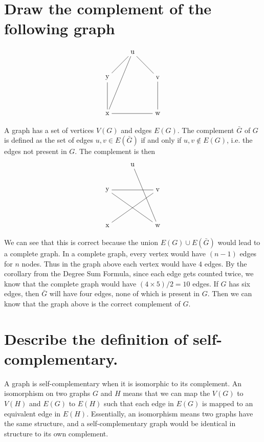 \documentclass{article}
\begin{document}
\section{Draw the complement of the following graph}
\begin{equation}
\centering
\begin{tikzpicture}[node distance=5em]
	\node (u) at (0,0) {u};
	\node (y) [below left of=u] {y};
	\node (v) [below right of=u] {v};
	\node (x) [below of=y] {x};
	\node (w) [below of=v] {w};

	\path[-] (u) edge (y);
	\path[-] (u)  edge (v);
	\path[-]  (u) edge  (x);
	\path[-]  (y) edge  (x);
	\path[-]  (v) edge  (w);
	\path[-]  (x) edge  (w);
\end{tikzpicture}
\end{equation}

A graph has a set of vertices $V(G)$ and edges $E(G)$.
The complement $\bar{G}$ of $G$ is defined as the set of edges $u,v\in E(\bar{G})$
if and only if $u,v\notin E(G)$, i.e. the edges not present in $G$.
The complement is then
\begin{equation}
	\begin{tikzpicture}[node distance=5em]
		\node (u) at (0,0) {u};
		\node (y) [below left of=u] {y};
		\node (v) [below right of=u] {v};
		\node (x) [below of=y] {x};
		\node (w) [below of=v] {w};

		\path[-] (y) edge(v);
		\path[-] (y) edge(w);
		\path[-] (u) edge(w);
		\path[-] (v) edge(x);
	\end{tikzpicture}
\end{equation}

We can see that this is correct because the union $E(G)\cup E(\bar{G})$ would lead to a complete graph.
In a complete graph, every vertex would have $(n-1)$ edges for $n$ nodes. 
Thus in the graph above each vertex would have $4$ edges.
By the corollary from the Degree Sum Formula, since each edge gets counted twice, we know that 
the complete graph would have $(4\times 5)/2 = 10$ edges.
If $G$ has six edges, then $\bar{G}$ will have four edges, none of which is present in $G$.
Then we can know that the graph above is the correct complement of $G$.

\section{Describe the definition of self-complementary.}
A graph is self-complementary when it is isomorphic to its complement.
An isomorphism on two graphs $G$ and $H$ means that we can map the $V(G)$ to $V(H)$ and $E(G)$ to $E(H)$ such that
each edge  in $E(G)$ is mapped to an equivalent edge in $E(H)$.
Essentially, an isomorphism means two graphs have the same structure, and a self-complementary graph would be identical
in structure to its own complement.
\end{document}
